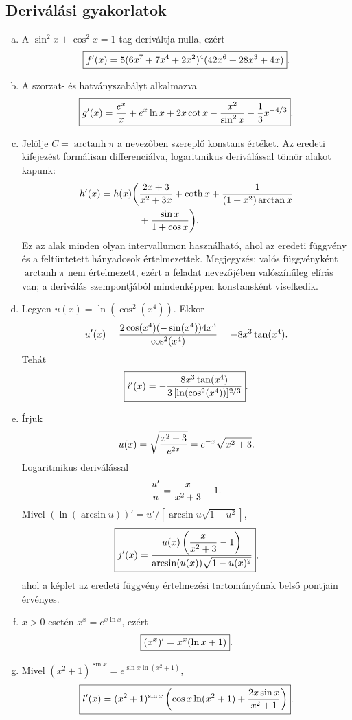 \documentclass{szb-solution}
\begin{document}
\subsection{Deriválási gyakorlatok}

\begin{enumerate}[a)]
  \item A $\sin^2x+\cos^2x=1$ tag deriváltja nulla, ezért
        $$
          \boxed{
          f'(x)=5(6x^7+7x^4+2x^2)^4(42x^6+28x^3+4x)}
          \text.
        $$

  \item A szorzat- és hatványszabályt alkalmazva
        $$
          \boxed{
          g'(x)=\frac{e^x}{x}+e^x\ln x
          +2x\cot x-\frac{x^2}{\sin^2x}-\frac13x^{-4/3}}
          \text.
        $$

  \item Jelölje $C=\operatorname{arctanh}\pi$ a nevezőben szereplő
        konstans értéket. Az eredeti kifejezést formálisan differenciálva,
        logaritmikus deriválással tömör alakot kapunk:
        \begin{align*}
          h'(x)=h(x)\bigg(&\frac{2x+3}{x^2+3x}
          +\coth x
          +\frac{1}{(1+x^2)\arctan x}\\
          &+\frac{\sin x}{1+\cos x}\bigg)
          \text.
        \end{align*}
        Ez az alak minden olyan intervallumon használható, ahol az eredeti
        függvény és a feltüntetett hányadosok értelmezettek. Megjegyzés: valós
        függvényként $\operatorname{arctanh}\pi$ nem értelmezett, ezért a
        feladat nevezőjében valószínűleg elírás van; a deriválás szempontjából
        mindenképpen konstansként viselkedik.

  \item Legyen $u(x)=\ln(\cos^2(x^4))$. Ekkor
        $$
          u'(x)=\frac{2\cos(x^4)(-\sin(x^4))4x^3}{\cos^2(x^4)}
          =-8x^3\tan(x^4)
          \text.
        $$
        Tehát
        $$
          \boxed{
          i'(x)=-\frac{8x^3\tan(x^4)}
          {3\,[\ln(\cos^2(x^4))]^{2/3}}}
          \text.
        $$

  \item Írjuk
        $$
          u(x)=\sqrt{\frac{x^2+3}{e^{2x}}}
          =e^{-x}\sqrt{x^2+3}
          \text.
        $$
        Logaritmikus deriválással
        $$
          \frac{u'}u=\frac{x}{x^2+3}-1
          \text.
        $$
        Mivel $(\ln(\arcsin u))'=u'/[\arcsin u\sqrt{1-u^2}]$,
        $$
          \boxed{
          j'(x)=\frac{u(x)\left(\dfrac{x}{x^2+3}-1\right)}
          {\arcsin(u(x))\sqrt{1-u(x)^2}}}
          \text,
        $$
        ahol a képlet az eredeti függvény értelmezési tartományának belső
        pontjain érvényes.

  \item $x>0$ esetén $x^x=e^{x\ln x}$, ezért
        $$
          \boxed{(x^x)'=x^x(\ln x+1)}
          \text.
        $$

  \item Mivel $(x^2+1)^{\sin x}
        =e^{\sin x\ln(x^2+1)}$,
        $$
          \boxed{
          l'(x)=(x^2+1)^{\sin x}
          \left(\cos x\ln(x^2+1)+\frac{2x\sin x}{x^2+1}\right)}
          \text.
        $$
\end{enumerate}
\end{document}
